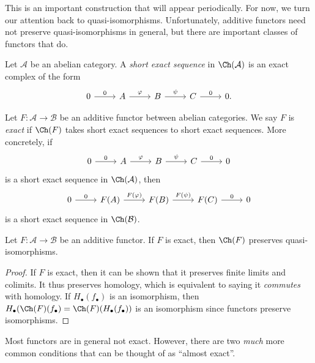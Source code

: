 This is an important construction that will appear periodically. For now, we turn our attention back to quasi-isomorphisms. Unfortunately, additive functors need not preserve quasi-isomorphisms in general, but there are important classes of functors that do.

\begin{definition}\label{7.2}
	Let $\mathcal{A} $ be an abelian category. A \emph{short exact sequence} in $\Ch(\mathcal{A} ) $ is an exact complex of the form
	\[\begin{tikzcd}[row sep = 2.5em, column sep = 2.5em]
	0\ar[" 0 ", r]  & A\ar[" \varphi  ", r]  & B \ar[" \psi  ", r]  & C\ar[" 0 ", r]  & 0.
	\end{tikzcd}\]
\end{definition}
\begin{definition}\label{7.3}
	Let $F : \mathcal{A}  \to \mathcal{B} $ be an additive functor between abelian categories. We say $F$ is \emph{exact} if $\Ch(F)$ takes short exact sequences to short exact sequences. More concretely, if
	\[\begin{tikzcd}[row sep = 2.5em, column sep = 2.5em]
	0\ar[" 0 ", r]  & A \ar[" \varphi  ", r]  & B \ar[" \psi  ", r]  & C\ar[" 0 ", r]  & 0
	\end{tikzcd}\]
	is a short exact sequence in $\Ch(\mathcal{A} ) $, then
	\[\begin{tikzcd}[row sep = 2.5em, column sep = 2.5em]
	0\ar[" 0 ", r]  & F(A)\ar[" F(\varphi ) ", r]  & F(B)\ar[" F(\psi ) ", r]  & F(C)\ar[" 0 ", r]  & 0
	\end{tikzcd}\]
	is a short exact sequence in $\Ch(\mathcal{B} ) $.
\end{definition}
\begin{proposition}\label{7.4}
	Let $F : \mathcal{A}  \to \mathcal{B} $ be an additive functor. If $F$ is exact, then $\Ch(F) $ preserves quasi-isomorphisms.
\end{proposition}
\begin{proof}
	If $F$ is exact, then it can be shown that it preserves finite limits and colimits. It thus preserves homology, which is equivalent to saying it \emph{commutes} with homology. If $H_{\bullet} (f_{\bullet} )$ is an isomorphism, then $H_{\bullet} (\Ch(F)(f_{\bullet} )=\Ch(F)(H_{\bullet} (f_{\bullet} ))$ is an isomorphism since functors preserve isomorphisms.
\end{proof}

Most functors are in general not exact. However, there are two \emph{much} more common conditions that can be thought of as ``almost exact''.

